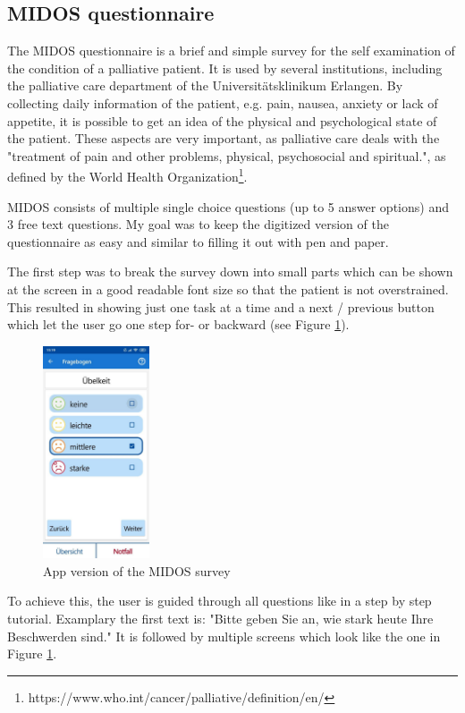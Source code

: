 \subsection{MIDOS questionnaire}
The MIDOS questionnaire \cite{midos} is a brief and simple survey for the self examination of the condition of a palliative patient. It is used by several institutions, including the palliative care department of the Universitätsklinikum Erlangen. By collecting daily information of the patient, e.g. pain, nausea, anxiety or lack of appetite, it is possible to get an idea of the physical and psychological state of the patient. These aspects are very important, as palliative care deals with the "treatment of pain and other problems, physical, psychosocial and spiritual.", as defined by the World Health Organization\footnote{https://www.who.int/cancer/palliative/definition/en/}.

MIDOS consists of multiple single choice questions (up to 5 answer options) and 3 free text questions. My goal was to keep the digitized version of the questionnaire as easy and similar to filling it out with pen and paper.

The first step was to break the survey down into small parts which can be shown at the screen in a good readable font size so that the patient is not overstrained. This resulted in showing just one task at a time and a next / previous button which let the user go one step for- or backward (see Figure \ref{fig:midos1}).

\begin{figure}
\vspace{-10pt}
  \begin{center}
    \includegraphics[width=0.28\textwidth]{figures/KlausMidos.jpg}
  \end{center}
  \caption{App version of the MIDOS survey}
  \label{fig:midos1}
  \vspace{-30pt}
\end{figure}
To achieve this, the user is guided through all questions like in a step by step tutorial. Examplary the first text is: "Bitte geben Sie an, wie stark heute Ihre Beschwerden sind." It is followed by multiple screens which look like the one in Figure \ref{fig:midos1}.
